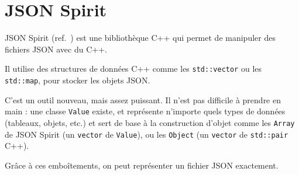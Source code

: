 \section{JSON Spirit}
JSON Spirit (ref.~\cite{JsonSpirit}) est une bibliothèque C++ qui permet de manipuler des fichiers JSON avec du C++.

Il utilise des structures de données C++ comme les \verb|std::vector| ou les \verb|std::map|, pour stocker les objets JSON. 

C'est un outil nouveau, mais assez puissant. Il n'est pas difficile à prendre en main : une classe \verb|Value| existe, et représente n'importe quels types de données (tableaux, objets, etc.) et sert de base à la construction d'objet comme les \verb|Array| de JSON Spirit (un \verb|vector| de \verb|Value|), ou les \verb|Object| (un \verb|vector| de \verb|std::pair| C++).

Grâce à ces emboîtements, on peut représenter un fichier JSON exactement.
